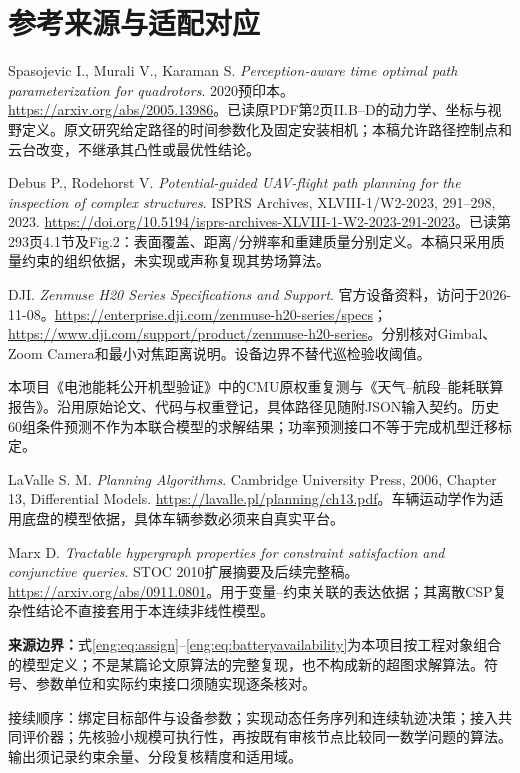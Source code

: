 \clearpage

\section{参考来源与适配对应}
\noindent [R1] Spasojevic I., Murali V., Karaman S. \emph{Perception-aware time optimal path parameterization for quadrotors}. 2020预印本。\url{https://arxiv.org/abs/2005.13986}。已读原PDF第2页II.B--D的动力学、坐标与视野定义。原文研究给定路径的时间参数化及固定安装相机；本稿允许路径控制点和云台改变，不继承其凸性或最优性结论。

\medskip\noindent [R2] Debus P., Rodehorst V. \emph{Potential-guided UAV-flight path planning for the inspection of complex structures}. ISPRS Archives, XLVIII-1/W2-2023, 291--298, 2023. \url{https://doi.org/10.5194/isprs-archives-XLVIII-1-W2-2023-291-2023}。已读第293页4.1节及Fig.2：表面覆盖、距离/分辨率和重建质量分别定义。本稿只采用质量约束的组织依据，未实现或声称复现其势场算法。

\medskip\noindent [R3] DJI. \emph{Zenmuse H20 Series Specifications and Support}. 官方设备资料，访问于2026-11-08。\url{https://enterprise.dji.com/zenmuse-h20-series/specs}；\url{https://www.dji.com/support/product/zenmuse-h20-series}。分别核对Gimbal、Zoom Camera和最小对焦距离说明。设备边界不替代巡检验收阈值。

\medskip\noindent [R4] 本项目《电池能耗公开机型验证》中的CMU原权重复测与《天气--航段--能耗联算报告》。沿用原始论文、代码与权重登记，具体路径见随附JSON输入契约。历史60组条件预测不作为本联合模型的求解结果；功率预测接口不等于完成机型迁移标定。

\medskip\noindent [R5] LaValle S. M. \emph{Planning Algorithms}. Cambridge University Press, 2006, Chapter 13, Differential Models. \url{https://lavalle.pl/planning/ch13.pdf}。车辆运动学作为适用底盘的模型依据，具体车辆参数必须来自真实平台。

\medskip\noindent [R6] Marx D. \emph{Tractable hypergraph properties for constraint satisfaction and conjunctive queries}. STOC 2010扩展摘要及后续完整稿。\url{https://arxiv.org/abs/0911.0801}。用于变量--约束关联的表达依据；其离散CSP复杂性结论不直接套用于本连续非线性模型。

\medskip\noindent\textbf{来源边界：}式\eqref{eng:eq:assign}--\eqref{eng:eq:batteryavailability}为本项目按工程对象组合的模型定义；不是某篇论文原算法的完整复现，也不构成新的超图求解算法。符号、参数单位和实际约束接口须随实现逐条核对。

\medskip\noindent 接续顺序：绑定目标部件与设备参数；实现动态任务序列和连续轨迹决策；接入共同评价器；先核验小规模可执行性，再按既有审核节点比较同一数学问题的算法。输出须记录约束余量、分段复核精度和适用域。
